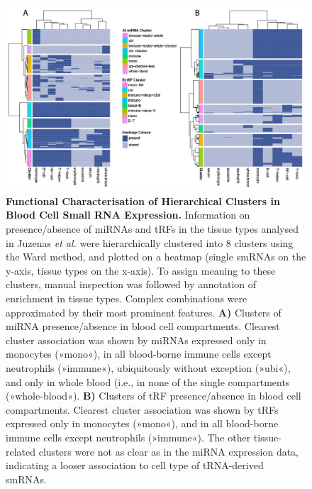 \begin{figure}[ht]
\includegraphics[width=\textwidth]{figures/heatmaps-small}
\caption[Functional Characterisation of Hierarchical Clusters in Blood Cell Small RNA Expression.]{\textbf{Functional Characterisation of Hierarchical Clusters in Blood Cell Small RNA Expression.} Information on presence/absence of miRNAs and tRFs in the tissue types analysed in Juzenas \emph{et al.}\cite{Juzenas2017} were hierarchically clustered into 8 clusters using the Ward method,\cite{Ward1963} and plotted on a heatmap (single smRNAs on the y-axis, tissue types on the x-axis). To assign meaning to these clusters, manual inspection was followed by annotation of enrichment in tissue types. Complex combinations were approximated by their most prominent features. \textbf{A)} Clusters of miRNA presence/absence in blood cell compartments. Clearest cluster association was shown by miRNAs expressed only in monocytes (»mono«), in all blood-borne immune cells except neutrophils (»immune«), ubiquitously without exception (»ubi«), and only in whole blood (i.e., in none of the single compartments (»whole-blood«). \textbf{B)} Clusters of tRF presence/absence in blood cell compartments. Clearest cluster association was shown by tRFs expressed only in monocytes (»mono«), and in all blood-borne immune cells except neutrophils (»immune«). The other tissue-related clusters were not as clear as in the miRNA expression data, indicating a looser association to cell type of tRNA-derived smRNAs.
\label{fig:heatmaps-small}}
\end{figure}


